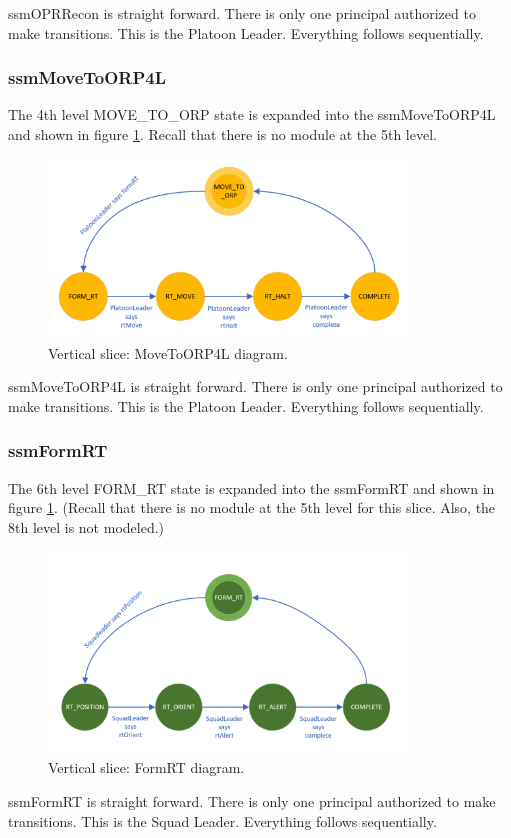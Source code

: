 \documentclass[../../main/main.tex]{subfiles}
\begin{document}
ssmOPRRecon is straight forward. There is only one principal authorized to make transitions.  This is the Platoon Leader.  Everything follows sequentially.  

\clearpage
\subsubsection{ssmMoveToORP4L}\label{sssec:ssmMoveToORP4L}
The 4th level MOVE_TO_ORP state is expanded into the ssmMoveToORP4L  and shown in figure \ref{moveToORP4LDiagram}.  Recall that there is no module at the 5th level.  

\begin{figure}[h!]
\centering
\includegraphics[width=0.85\textwidth]{../figures/moveToORP4LDiagram}
\caption{\label{moveToORP4LDiagram} Vertical slice: MoveToORP4L diagram.}
\end{figure}

ssmMoveToORP4L is straight forward. There is only one principal authorized to make transitions.  This is the Platoon Leader.  Everything follows sequentially.  
\clearpage

\subsubsection{ssmFormRT}\label{sssec:ssmFormRT}
The 6th level FORM_RT state is expanded into the ssmFormRT  and shown in figure \ref{moveToORP4LDiagram}.  (Recall that there is no module at the 5th level for this slice.  Also, the 8th level is not modeled.)

\begin{figure}[h!]
\centering
\includegraphics[width=0.85\textwidth]{../figures/ssmFormRTDiagram}
\caption{\label{ssmFormRTDiagram} Vertical slice: FormRT diagram.}
\end{figure}

ssmFormRT is straight forward. There is only one principal authorized to make transitions.  This is the Squad Leader.  Everything follows sequentially.  
\end{document}
